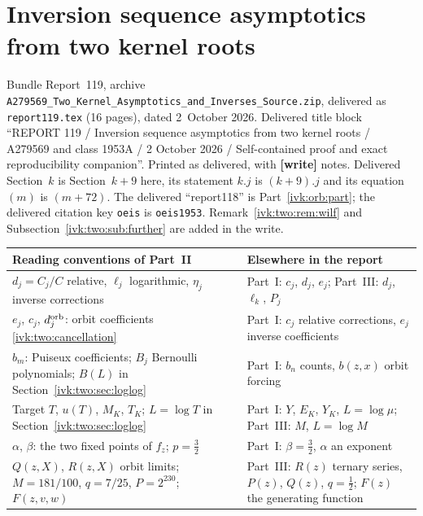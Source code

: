 \documentclass[11pt,letterpaper]{article}
\theoremstyle{remark}\newtheorem{remark}[theorem]{Remark}
\newcommand{\file}[1]{\nolinkurl{#1}}
\newcommand{\partsource}[1]{\par\noindent\begin{minipage}{\textwidth}\small #1\end{minipage}\par\medskip}
\begin{document}
\clearpage
\part{Inversion sequence asymptotics from two kernel roots}\label{ivk:two:part}
\partsource{Bundle Report~119, archive \file{A279569_Two_Kernel_Asymptotics_and_Inverses_Source.zip}, delivered as \file{report119.tex} (16 pages), dated 2~October 2026. Delivered title block ``REPORT 119 / Inversion sequence asymptotics from two kernel roots / A279569 and class 1953A / 2 October 2026 / Self-contained proof and exact reproducibility companion''. Printed as delivered, with \textbf{[write]} notes. Delivered Section~$k$ is Section~$k+9$ here, its statement $k.j$ is $(k+9).j$ and its equation $(m)$ is $(m+72)$. The delivered ``report118'' is Part~\ref{ivk:orb:part}; the delivered citation key \texttt{oeis} is \texttt{oeis1953}. Remark~\ref{ivk:two:rem:wilf} and Subsection~\ref{ivk:two:sub:further} are added in the write.}
\begin{center}
\small
\begin{tabular}{@{}>{\raggedright\arraybackslash}p{} >{\raggedright\arraybackslash}p{}@{}}
\toprule
Reading conventions of Part~II & Elsewhere in the report\\
\midrule
$d_j=C_j/C$ relative, $\ell_j$ logarithmic, $\eta_j$ inverse corrections & Part~I: $c_j$, $d_j$, $e_j$; Part~III: $d_j$, $\ell_k$, $P_j$\\
$e_j$, $c_j$, $d_j^{\rm orb}$: orbit coefficients \eqref{ivk:two:cancellation} & Part~I: $c_j$ relative corrections, $e_j$ inverse coefficients\\
$b_m$: Puiseux coefficients; $B_j$ Bernoulli polynomials; $B(L)$ in Section~\ref{ivk:two:sec:loglog} & Part~I: $b_n$ counts, $b(z,x)$ orbit forcing\\
Target $T$, $u(T)$, $M_K$, $T_K$; $L=\log T$ in Section~\ref{ivk:two:sec:loglog} & Part~I: $Y$, $E_K$, $Y_K$, $L=\log\mu$; Part~III: $M$, $L=\log M$\\
$\alpha$, $\beta$: the two fixed points of $f_z$; $p=\frac32$ & Part~I: $\beta=\frac32$, $\alpha$ an exponent\\
$Q(z,X)$, $R(z,X)$ orbit limits; $M=181/100$, $q=7/25$, $P=2^{230}$; $F(z,v,w)$ & Part~III: $R(z)$ ternary series, $P(z)$, $Q(z)$, $q=\frac12$; $F(z)$ the generating function\\
\bottomrule
\end{tabular}
\end{center}
\end{document}

